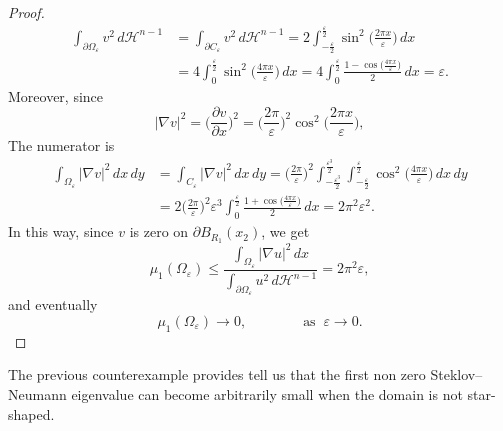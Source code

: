 \documentclass[12pt,reqno]{amsart}
\numberwithin{equation}{section}
\numberwithin{theorem}{section}
\numberwithin{equation}{section}
\numberwithin{theorem}{section}
\begin{document}
\begin{proof}
\begin{equation*}
\begin{split}
\int_{\partial \Omega_\varepsilon}v^2 \,d\mathcal{H}^{n-1}&= \int_{\partial C_\varepsilon}v^2\,d\mathcal{H}^{n-1} = 2\int_{-\frac{\varepsilon}{2}}^{\frac{\varepsilon}{2}}\sin^2 \bigg(\displaystyle\frac{2\pi x}{\varepsilon}\bigg)\,dx\\
&=4\int_0^{\frac{\varepsilon}{2}} \sin^2\bigg(\displaystyle\frac{4\pi x}{\varepsilon}\bigg)\,dx
=4\displaystyle\int_0^{\frac{\varepsilon}{2}}\frac{1-\cos\bigg(\displaystyle\frac{4\pi x}{\varepsilon}\bigg)}{2}\,dx=\varepsilon.
\end{split}
\end{equation*}
Moreover, since
\begin{equation*}
	|\nabla v|^2 = \bigg(\frac{\partial v}{\partial x}\bigg)^2 = \bigg(\frac{2\pi}{\varepsilon}\bigg)^2 \cos^2\bigg(\displaystyle\frac{2\pi x}{\varepsilon}\bigg),
\end{equation*}
The numerator is
\begin{equation*}
\begin{split}
\int_{\Omega_\varepsilon}|\nabla v|^2 \,dx\,dy&= \int_{C_\varepsilon}|\nabla v|^2\,dx\,dy = \bigg(\frac{2\pi }{\varepsilon}\bigg)^2\int_{-\frac{\varepsilon^3}{2}}^{\frac{\varepsilon^3}{2}}\int_{-\frac{\varepsilon}{2}}^{\frac{\varepsilon}{2}} \cos^2\bigg(\displaystyle\frac{4\pi x}{\varepsilon}\bigg)\,dx\,dy \\
&= 2\bigg(\frac{2\pi }{\varepsilon}\bigg)^2\varepsilon^3\int_0^{\frac{\varepsilon}{2}}\frac{1+\cos\bigg(\displaystyle\frac{4\pi x}{\varepsilon}\bigg)}{2}\,dx=2\pi^2\varepsilon^2.
\end{split}
\end{equation*}
In this way, since $v$ is zero on $\partial B_{R_1}(x_2)$, we get
\begin{equation*}
	\mu_1(\Omega_\varepsilon)\le \frac{\displaystyle \int_{\Omega_\varepsilon}|\nabla u|^2\,dx}{\displaystyle \int_{\partial \Omega_\varepsilon}u^2 \,d\mathcal{H}^{n-1}}= 2\pi^2\varepsilon,
\end{equation*}
and eventually
\begin{equation*}
	\mu_1(\Omega_\varepsilon)\to 0, \qquad \qquad \text{as}\;\;\varepsilon\to 0. 
\end{equation*}
    \end{proof}

The previous counterexample provides tell us that the first non zero Steklov--Neumann eigenvalue can become arbitrarily small when the domain is not star-shaped. 
\end{document}
